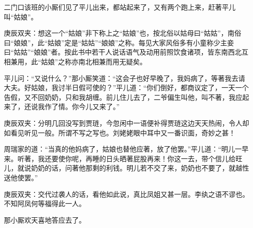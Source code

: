 \begin{parag}
    二门口该班的小厮们见了平儿出来，都站起来了，又有两个跑上来，赶著平儿叫“姑娘”。\begin{note}庚辰双夹：想这一个“姑娘”非下称上之“姑娘”也，按北俗以姑母曰“姑姑”，南俗曰“娘娘”，此“姑娘”定是“姑姑”“娘娘”之称。每见大家风俗多有小童称少主妾曰“姑姑”“娘娘”者。按此书中若干人说话语气及动用前照饮食诸项，皆东南西北互相兼用，此“姑娘”之称亦南北相兼而用无疑矣。\end{note}平儿问：“又说什么？”那小厮笑道：“这会子也好早晚了，我妈病了，等著我去请大夫。好姑娘，我讨半日假可使的？”平儿道：“你们倒好，都商议定了，一天一个告假，又不回奶奶，只和我胡缠。前儿住儿去了，二爷偏生叫他，叫不著，我应起来了，还说我作了情。你今儿又来了。”\begin{note}庚辰双夹：分明几回没写到贾琏，今忽闲中一语便补得贾琏这边天天热闹，令人却如看见听见一般。所谓不写之写也。刘姥姥眼中耳中又一番识面，奇妙之甚！\end{note}周瑞家的道：“当真的他妈病了，姑娘也替他应著，放了他罢。”平儿道：“明儿一早来。听著，我还要使你呢，再睡的日头晒著屁股再来！你这一去，带个信儿给旺儿，就说奶奶的话，问著他那剩的利钱。明儿若不交了来，奶奶也不要了，就越性送他使罢。”\begin{note}庚辰双夹：交代过袭人的话，看他如此说，真比凤姐又甚一层。李纨之语不谬也。不知阿凤何等福得此一人。\end{note}那小厮欢天喜地答应去了。
\end{parag}


